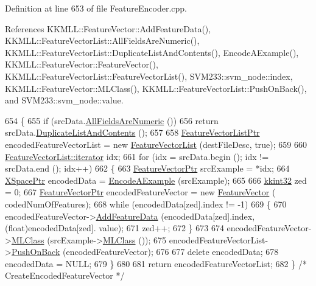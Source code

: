 Definition at line 653 of file Feature\+Encoder.\+cpp.



References K\+K\+M\+L\+L\+::\+Feature\+Vector\+::\+Add\+Feature\+Data(), K\+K\+M\+L\+L\+::\+Feature\+Vector\+List\+::\+All\+Fields\+Are\+Numeric(), K\+K\+M\+L\+L\+::\+Feature\+Vector\+List\+::\+Duplicate\+List\+And\+Contents(), Encode\+A\+Example(), K\+K\+M\+L\+L\+::\+Feature\+Vector\+::\+Feature\+Vector(), K\+K\+M\+L\+L\+::\+Feature\+Vector\+List\+::\+Feature\+Vector\+List(), S\+V\+M233\+::svm\+\_\+node\+::index, K\+K\+M\+L\+L\+::\+Feature\+Vector\+::\+M\+L\+Class(), K\+K\+M\+L\+L\+::\+Feature\+Vector\+List\+::\+Push\+On\+Back(), and S\+V\+M233\+::svm\+\_\+node\+::value.


\begin{DoxyCode}
654 \{
655   \textcolor{keywordflow}{if}  (srcData.\hyperlink{class_k_k_m_l_l_1_1_feature_vector_list_a349dffffbca2b8f86120f1cfe2df5cbf}{AllFieldsAreNumeric} ())
656     \textcolor{keywordflow}{return}  srcData.\hyperlink{class_k_k_m_l_l_1_1_feature_vector_list_af14ad0946bbc6de8abdc4b513b6cf859}{DuplicateListAndContents} ();
657 
658   \hyperlink{class_k_k_m_l_l_1_1_feature_vector_list}{FeatureVectorListPtr}  encodedFeatureVectorList = \textcolor{keyword}{new} 
      \hyperlink{class_k_k_m_l_l_1_1_feature_vector_list}{FeatureVectorList} (destFileDesc, \textcolor{keyword}{true});
659 
660   \hyperlink{class_k_k_b_1_1_k_k_queue_aa3c2796a726eea468b94132a9fbf2cfe}{FeatureVectorList::iterator}  idx;
661   \textcolor{keywordflow}{for}  (idx = srcData.begin ();   idx != srcData.end ();  idx++)
662   \{
663     \hyperlink{class_k_k_m_l_l_1_1_feature_vector}{FeatureVectorPtr}  srcExample = *idx;
664     \hyperlink{struct_s_v_m233_1_1svm__node}{XSpacePtr}  encodedData = \hyperlink{class_k_k_m_l_l_1_1_feature_encoder_af82278dec57d34f3ebcf6ea97cc625d2}{EncodeAExample} (srcExample);
665 
666     \hyperlink{namespace_k_k_b_a8fa4952cc84fda1de4bec1fbdd8d5b1b}{kkint32}  zed = 0;
667     \hyperlink{class_k_k_m_l_l_1_1_feature_vector}{FeatureVectorPtr}  encodedFeatureVector = \textcolor{keyword}{new} \hyperlink{class_k_k_m_l_l_1_1_feature_vector}{FeatureVector} (
      codedNumOfFeatures);
668     \textcolor{keywordflow}{while}  (encodedData[zed].index != -1)
669     \{
670       encodedFeatureVector->\hyperlink{class_k_k_m_l_l_1_1_feature_vector_abf364e3348c041cd7be6f14d6c4567cf}{AddFeatureData} (encodedData[zed].index, (\textcolor{keywordtype}{float})encodedData[zed].
      value);
671       zed++;
672     \}
673 
674     encodedFeatureVector->\hyperlink{class_k_k_m_l_l_1_1_feature_vector_a3c8fe002c6e868f8c00059c004fb32fd}{MLClass} (srcExample->\hyperlink{class_k_k_m_l_l_1_1_feature_vector_a3c8fe002c6e868f8c00059c004fb32fd}{MLClass} ());
675     encodedFeatureVectorList->\hyperlink{class_k_k_m_l_l_1_1_feature_vector_list_abd43779a90a6aa3db1de8092be877bdb}{PushOnBack} (encodedFeatureVector);
676 
677     \textcolor{keyword}{delete}  encodedData;
678     encodedData = NULL;
679   \}
680 
681   \textcolor{keywordflow}{return}  encodedFeatureVectorList;
682 \}  \textcolor{comment}{/* CreateEncodedFeatureVector */}
\end{DoxyCode}
